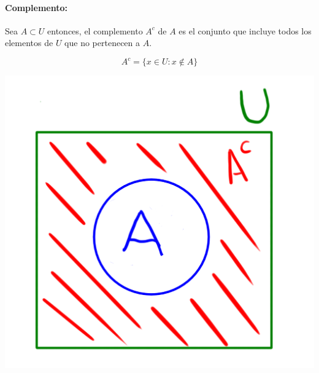 \paragraph{Complemento: }
Sea $A\subset U$ entonces, el complemento $A^c$ de $A$ es el conjunto que incluye todos los elementos de $U$ que no pertenecen a $A$.
    \begin{center}
    \begin{minipage}{0.3\textwidth}
        \begin{equation*}
            A^c = \{x\in U : x\notin A\}
        \end{equation*}
    \end{minipage}
    \begin{minipage}{0.4\textwidth}
         \includegraphics[scale=0.3]{imagenes/complemento.png}
    \end{minipage}
    \end{center}
    
